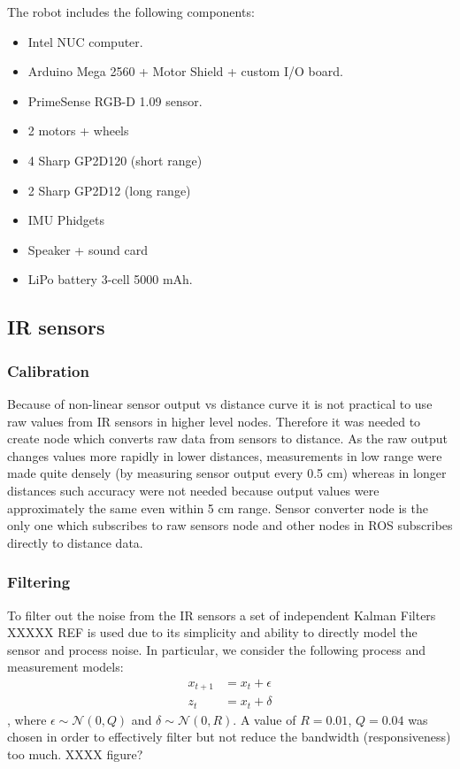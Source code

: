 The robot includes the following components:
\begin{itemize}
\item Intel NUC computer.
\item Arduino Mega 2560 + Motor Shield + custom I/O board.
\item PrimeSense RGB-D 1.09 sensor.
\item 2 motors + wheels
\item 4 Sharp GP2D120 (short range)
\item 2 Sharp GP2D12 (long range)
\item IMU Phidgets
\item Speaker + sound card
\item LiPo battery 3-cell 5000 mAh.
\end{itemize}

\subsection{IR sensors}
\subsubsection{Calibration}

Because of non-linear sensor output vs distance curve it is not practical to use raw values from IR sensors in higher level nodes. Therefore it was needed to create node which converts raw data from sensors to distance. As the raw output changes values more rapidly in lower distances, measurements in low range were made quite densely (by measuring sensor output every 0.5 cm) whereas in longer distances such accuracy were not needed because output values were approximately the same even within 5 cm range. Sensor converter node is the only one which subscribes to raw sensors node and other nodes in ROS subscribes directly to distance data.

\subsubsection{Filtering}

To filter out the noise from the IR sensors a set of independent Kalman Filters XXXXX REF is used due to its simplicity and ability to directly model the sensor and process noise. 
In particular, we consider the following process and measurement models:
\begin{align*}
x_{t+1} &= x_t + \epsilon \\
z_t &= x_t + \delta
\end{align*}
, where $\epsilon \sim \mathcal{N}(0,Q)$ and $\delta \sim \mathcal{N}(0,R)$. A value of $R = 0.01$, $Q = 0.04$ was chosen in order to effectively filter but not reduce the bandwidth (responsiveness) too much. XXXX figure?